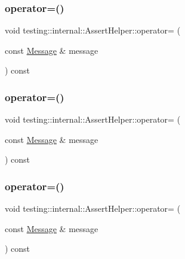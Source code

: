 \subsubsection{\texorpdfstring{operator=()}{operator=()}\hspace{0.1cm}{\footnotesize\ttfamily [1/3]}}
{\footnotesize\ttfamily void testing\+::internal\+::\+Assert\+Helper\+::operator= (\begin{DoxyParamCaption}\item[{const \mbox{\hyperlink{classtesting_1_1_message}{Message}} \&}]{message }\end{DoxyParamCaption}) const}

\mbox{\label{classtesting_1_1internal_1_1_assert_helper_a97bf22d786131ab7baa86b97a27aeb4d}} 
\subsubsection{\texorpdfstring{operator=()}{operator=()}\hspace{0.1cm}{\footnotesize\ttfamily [2/3]}}
{\footnotesize\ttfamily void testing\+::internal\+::\+Assert\+Helper\+::operator= (\begin{DoxyParamCaption}\item[{const \mbox{\hyperlink{classtesting_1_1_message}{Message}} \&}]{message }\end{DoxyParamCaption}) const}

\mbox{\label{classtesting_1_1internal_1_1_assert_helper_a97bf22d786131ab7baa86b97a27aeb4d}} 
\subsubsection{\texorpdfstring{operator=()}{operator=()}\hspace{0.1cm}{\footnotesize\ttfamily [3/3]}}
{\footnotesize\ttfamily void testing\+::internal\+::\+Assert\+Helper\+::operator= (\begin{DoxyParamCaption}\item[{const \mbox{\hyperlink{classtesting_1_1_message}{Message}} \&}]{message }\end{DoxyParamCaption}) const}



